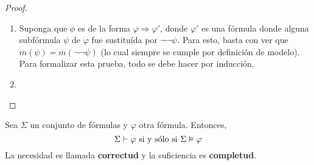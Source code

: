 \documentclass[12pt]{report}
\theoremstyle{largebreak}
\begin{document}
\begin{proof}
\begin{enumerate}
            \item Suponga que $\phi$ es de la forma $\varphi\Rightarrow\varphi'$, donde $\varphi'$ es una fórmula donde alguna subfórmula $\psi$ de $\varphi$ fue sustituída por $\neg\neg\psi$. Para esto, basta con ver que $\overline{m}(\psi)=\overline{m}(\neg\neg\psi)$ (lo cual siempre se cumple por definición de modelo). Para formalizar esta prueba, todo se debe hacer por inducción. %
            
            \item %
        \end{enumerate}
    \end{proof}

    \begin{theor}
        Sea $\Sigma$ un conjunto de fórmulas y $\varphi$ otra fórmula. Entonces,
        \begin{equation*}
            \Sigma\vdash\varphi\textup{ si y sólo si }\Sigma\vDash\varphi
        \end{equation*}
        La necesidad es llamada \textbf{correctud} y la suficiencia es \textbf{completud}.
    \end{theor}
\end{document}
